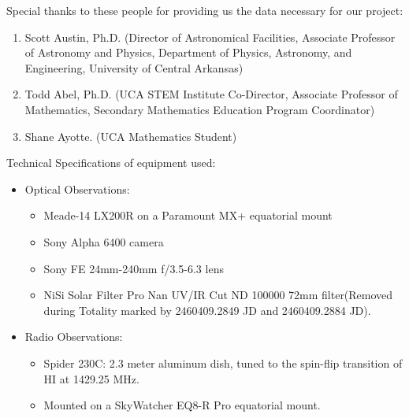 \noindent Special thanks to these people for providing us the data necessary for our project:

\begin{enumerate}
    \item Scott Austin, Ph.D. (Director of Astronomical Facilities, Associate Professor of Astronomy and Physics, Department of Physics, Astronomy, and Engineering, University of Central Arkansas) 
    \item Todd Abel, Ph.D. (UCA STEM Institute Co-Director, Associate Professor of Mathematics, Secondary Mathematics Education Program Coordinator)
    \item Shane Ayotte. (UCA Mathematics Student)
\end{enumerate}

Technical Specifications of equipment used:
\begin{itemize}
    \item Optical Observations:
    \begin{itemize}
        \item Meade-14 LX200R on a Paramount MX+ equatorial mount
        \item Sony Alpha 6400 camera
        \item Sony FE 24mm-240mm f/3.5-6.3 lens
        \item NiSi Solar Filter Pro Nan UV/IR Cut ND 100000 72mm filter(Removed during Totality marked by 2460409.2849 JD and 2460409.2884 JD).
    \end{itemize}
    \item Radio Observations:
    \begin{itemize}
        \item Spider 230C: 2.3 meter aluminum dish, tuned to the spin-flip transition of HI at 1429.25 MHz.
        \item Mounted on a SkyWatcher EQ8-R Pro equatorial mount.
    \end{itemize}
\end{itemize}
